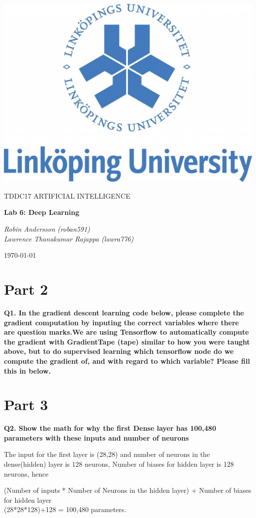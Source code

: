 \documentclass[a4paper,10pt]{article}
\begin{document}
\begin{titlepage}
	\centering
	\includegraphics[width=.6\textwidth]{liu-logo.png}\par
	\vfill
	{\scshape\Large TDDC17 ARTIFICIAL INTELLIGENCE\par}
	{\huge\bfseries Lab 6: Deep Learning\par}
	\vspace{1cm}
	{\large\itshape Robin Andersson (roban591) \\ Lawrence Thanakumar Rajappa (lawra776)\par}
	\vfill
	{\large \today\par}
\end{titlepage}

\section*{Part 2}
\textbf{Q1. In the gradient descent learning code below, please complete the gradient computation by inputing the
correct variables where there are question marks.We are using Tensorflow to automatically compute the gradient with
GradientTape (tape) similar to how you were taught above, but to do supervised learning which tensorflow node do
we compute the gradient of, and with regard to which variable? Please fill this in below.}



\section*{Part 3}

\textbf{Q2. Show the math for why the first Dense layer has 100,480 parameters with these inputs and number of neurons}

The input for the first layer is (28,28) and number of neurons in the dense(hidden) layer is 128 neurons,
Number of biases for hidden layer is 128 neurons, hence
\begin{center}
		(Number of inputs * Number of Neurons in the hidden layer) + Number of biases for hidden layer \\
		(28*28*128)+128 = 100,480 parameters.
\end{center}
\end{document}
